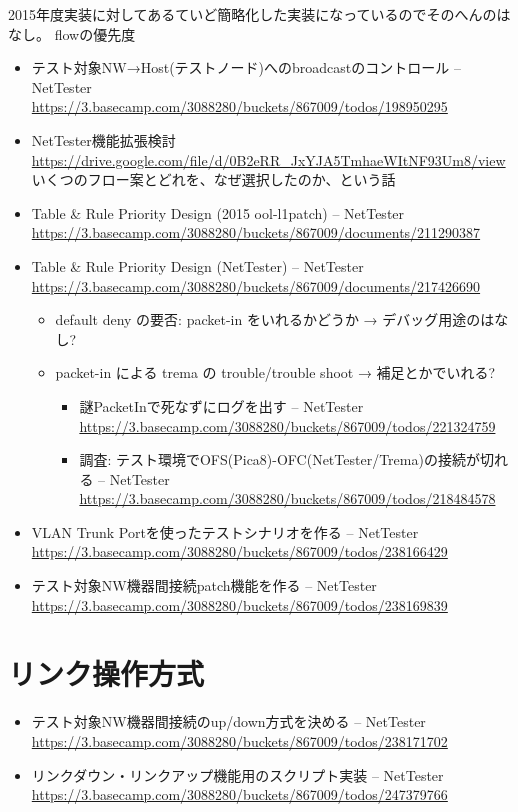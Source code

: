 2015年度実装に対してあるていど簡略化した実装になっているのでそのへんのはなし。
flowの優先度
\begin{itemize}
 \item テスト対象NW→Host(テストノード)へのbroadcastのコントロール – NetTester \url{https://3.basecamp.com/3088280/buckets/867009/todos/198950295}
 \item NetTester機能拡張検討
       \url{https://drive.google.com/file/d/0B2eRR_JxYJA5TmhaeWItNF93Um8/view}
       いくつのフロー案とどれを、なぜ選択したのか、という話
 \item Table \& Rule Priority Design (2015 ool-l1patch) – NetTester \url{https://3.basecamp.com/3088280/buckets/867009/documents/211290387}
 \item Table \& Rule Priority Design (NetTester) – NetTester \url{https://3.basecamp.com/3088280/buckets/867009/documents/217426690}
       \begin{itemize}
        \item default deny の要否: packet-in をいれるかどうか → デバッグ用途のはなし?
        \item packet-in による trema の trouble/trouble shoot → 補足とかでいれる?
              \begin{itemize}
               \item 謎PacketInで死なずにログを出す – NetTester \url{https://3.basecamp.com/3088280/buckets/867009/todos/221324759}
               \item 調査: テスト環境でOFS(Pica8)-OFC(NetTester/Trema)の接続が切れる – NetTester \url{https://3.basecamp.com/3088280/buckets/867009/todos/218484578}
              \end{itemize}
       \end{itemize}
 \item VLAN Trunk Portを使ったテストシナリオを作る – NetTester \url{https://3.basecamp.com/3088280/buckets/867009/todos/238166429}
 \item テスト対象NW機器間接続patch機能を作る – NetTester \url{https://3.basecamp.com/3088280/buckets/867009/todos/238169839}
\end{itemize}

\section{リンク操作方式}

\begin{itemize}
 \item テスト対象NW機器間接続のup/down方式を決める – NetTester \url{https://3.basecamp.com/3088280/buckets/867009/todos/238171702}
 \item リンクダウン・リンクアップ機能用のスクリプト実装 – NetTester \url{https://3.basecamp.com/3088280/buckets/867009/todos/247379766}
\end{itemize}

